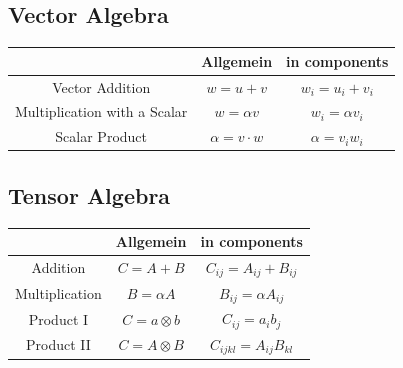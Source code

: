 \documentclass[a4paper]{scrartcl}
\begin{document}
\subsection{Vector Algebra}
\begin{tabular}{|c|c|c|}
\hline  & Allgemein & in components \\ 
\hline Vector Addition & $w=u+v$ & $w_i=u_i+v_i$ \\ 
\hline Multiplication with a Scalar & $w=\alpha v$ & $w_i=\alpha v_i$ \\ 
\hline Scalar Product & $\alpha = v \cdot w $ & $\alpha = v_i w_i$ \\ 
\hline 
\end{tabular} 

\subsection{Tensor Algebra}
\begin{tabular}{|c|c|c|}
\hline  & Allgemein & in components \\ 
\hline Addition & $C=A+B$ & $C_{ij}=A_{ij}+B_{ij}$ \\ 
\hline Multiplication& $B=\alpha A$ & $B_{ij}=\alpha A_{ij}$ \\ 
\hline Product I & $C = a \otimes b $ & $C_{ij} = a_i b_j$ \\ 
\hline Product II& $C = A \otimes B $ & $C_{ijkl} = A_{ij} B_{kl}$ \\
\hline 
\end{tabular} 
\end{document}
